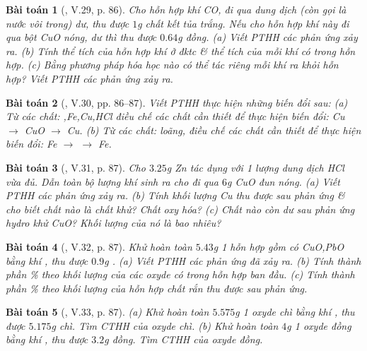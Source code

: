 \documentclass{article}
\newtheorem{baitoan}{Bài toán}
\begin{document}
\begin{baitoan}[\cite{Truong_BTNC_Hoa_Hoc_8_2022}, V.29, p. 86]
	Cho hỗn hợp khí \emph{CO,} đi qua dung dịch \emph{} (còn gọi là \emph{nước vôi trong}) dư, thu được $1$\emph{g} chất kết tủa trắng. Nếu cho hỗn hợp khí này đi qua bột \emph{CuO} nóng, dư thì thu được $0.64$\emph{g} đồng. (a) Viết PTHH các phản ứng xảy ra. (b) Tính thể tích của hỗn hợp khí ở đktc \& thể tích của mỗi khí có trong hỗn hợp. (c) Bằng phương pháp hóa học nào có thể tác riêng mỗi khí ra khỏi hỗn hợp? Viết PTHH các phản ứng xảy ra.
\end{baitoan}

\begin{baitoan}[\cite{Truong_BTNC_Hoa_Hoc_8_2022}, V.30, pp. 86--87]
	Viết PTHH thực hiện những biến đổi sau: (a) Từ các chất: \emph{,Fe,Cu,HCl} điều chế các chất cần thiết để thực hiện biến đổi: \emph{Cu $\to$ CuO $\to$ Cu}. (b) Từ các chất: \emph{} loãng, điều chế các chất cần thiết để thực hiện biến đổi: \emph{Fe $\to$  $\to$ Fe}.
\end{baitoan}

\begin{baitoan}[\cite{Truong_BTNC_Hoa_Hoc_8_2022}, V.31, p. 87]
	Cho $3.25$\emph{g Zn} tác dụng với 1 lượng dung dịch \emph{HCl} vừa đủ. Dẫn toàn bộ lượng khí sinh ra cho đi qua $6$\emph{g CuO} đun nóng. (a) Viết PTHH các phản ứng xảy ra. (b) Tính khối lượng \emph{Cu} thu được sau phản ứng \& cho biết chất nào là chất khử? Chất oxy hóa? (c) Chất nào còn dư sau phản ứng hydro khử \emph{CuO}? Khối lượng của nó là bao nhiêu?
\end{baitoan}

\begin{baitoan}[\cite{Truong_BTNC_Hoa_Hoc_8_2022}, V.32, p. 87]
	Khử hoàn toàn $5.43$\emph{g} 1 hỗn hợp gồm có \emph{CuO,PbO} bằng khí \emph{}, thu được $0.9$\emph{g }. (a) Viết PTHH các phản ứng đã xảy ra. (b) Tính thành phần \% theo khối lượng của các oxyde có trong hỗn hợp ban đầu. (c) Tính thành phần \% theo khối lượng của hỗn hợp chất rắn thu được sau phản ứng.
\end{baitoan}

\begin{baitoan}[\cite{Truong_BTNC_Hoa_Hoc_8_2022}, V.33, p. 87]
	(a) Khử hoàn toàn $5.575$\emph{g} 1 oxyde chì bằng khí \emph{}, thu được $5.175$\emph{g} chì. Tìm CTHH của oxyde chì. (b) Khử hoàn toàn $4$\emph{g} 1 oxyde đồng bằng khí \emph{}, thu được $3.2$\emph{g} đồng. Tìm CTHH của oxyde đồng.
\end{baitoan}
\end{document}
